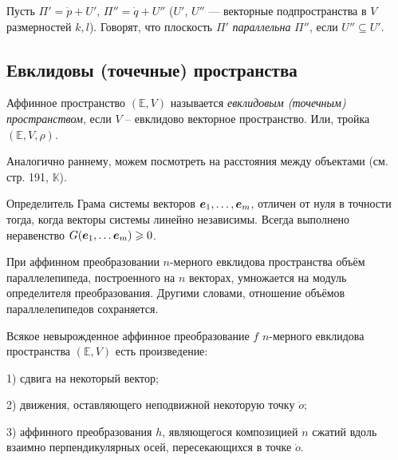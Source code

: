 \begin{to_def} 
    Пусть $\Pi' = \dot p + U'$, $\Pi'' = \dot q + U''$ ($U'$, $U''$ --- векторные подпространства в $V$ размерностей $k, l$). Говорят, что плоскость $\Pi'$ \textit{параллельна} $\Pi''$, если $U'' \subseteq U'$.
\end{to_def}

\subsection{Евклидовы (точечные) пространства}

\begin{to_def} 
    Аффинное пространство $(\mathbb{E}, V)$ называется \textit{евклидовым (точечным) пространством}, если $V$ -- евклидово векторное пространство. Или, тройка $(\mathbb{E}, V, \rho)$. 
\end{to_def}

Аналогично раннему, можем посмотреть на расстояния между объектами (см. стр. 191, $\mathbb{K}$).

\begin{to_thr} 
    Определитель Грама системы векторов $\mbox{\boldmath $e$}_1, \ldots, \mbox{\boldmath $e$}_m$, отличен от нуля в точности тогда, когда векторы системы линейно независимы. Всегда выполнено неравенство $G(\mbox{\boldmath $e$}_1, \ldots \mbox{\boldmath $e$}_m) \geqslant 0$. 
\end{to_thr}

\begin{to_thr} 
    При аффинном преобразовании $n$-мерного евклидова пространства объём параллелепипеда, построенного на $n$ векторах, умножается на модуль определителя преобразования. Другими словами, отношение объёмов параллелепипедов сохраняется. 
\end{to_thr}

\begin{to_thr} 
    Всякое невырожденное аффинное преобразование $f$  $n$-мерного евклидова пространства $(\mathbb{E}, V)$ есть произведение:

    1) сдвига на некоторый вектор; 

    2) движения, оставляющего неподвижной некоторую точку $\dot o$;

    3) аффинного преобразования $h$, являющегося композицией $n$ сжатий вдоль взаимно перпендикулярных осей, пересекающихся в точке $\dot o$.
\end{to_thr}

